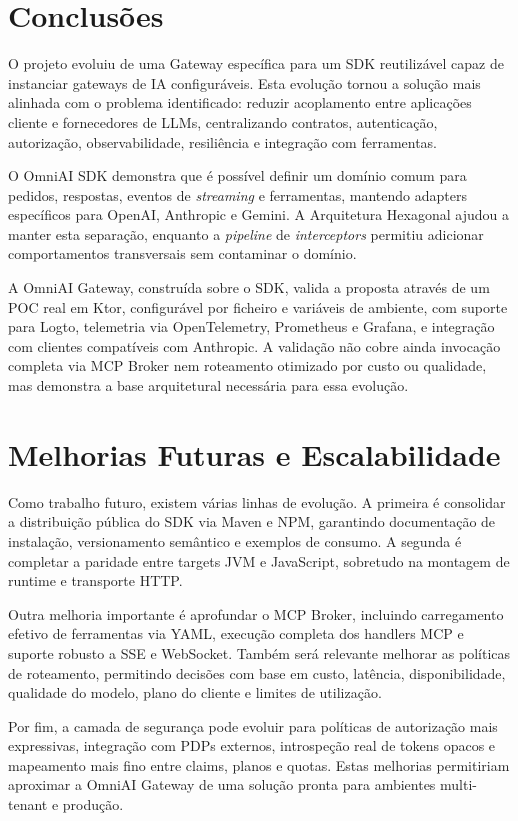 \documentclass[11pt,a4paper]{report}
\begin{document}
    \section{Conclusões}
    O projeto evoluiu de uma Gateway específica para um SDK reutilizável capaz de instanciar gateways de IA configuráveis. Esta evolução tornou a solução mais alinhada com o problema identificado: reduzir acoplamento entre aplicações cliente e fornecedores de LLMs, centralizando contratos, autenticação, autorização, observabilidade, resiliência e integração com ferramentas.

    O OmniAI SDK demonstra que é possível definir um domínio comum para pedidos, respostas, eventos de \textit{streaming} e ferramentas, mantendo adapters específicos para OpenAI, Anthropic e Gemini. A Arquitetura Hexagonal ajudou a manter esta separação, enquanto a \textit{pipeline} de \textit{interceptors} permitiu adicionar comportamentos transversais sem contaminar o domínio.

    A OmniAI Gateway, construída sobre o SDK, valida a proposta através de um POC real em Ktor, configurável por ficheiro e variáveis de ambiente, com suporte para Logto, telemetria via OpenTelemetry, Prometheus e Grafana, e integração com clientes compatíveis com Anthropic. A validação não cobre ainda invocação completa via MCP Broker nem roteamento otimizado por custo ou qualidade, mas demonstra a base arquitetural necessária para essa evolução.

    \section{Melhorias Futuras e Escalabilidade}
    Como trabalho futuro, existem várias linhas de evolução. A primeira é consolidar a distribuição pública do SDK via Maven e NPM, garantindo documentação de instalação, versionamento semântico e exemplos de consumo. A segunda é completar a paridade entre targets JVM e JavaScript, sobretudo na montagem de runtime e transporte HTTP.

    Outra melhoria importante é aprofundar o MCP Broker, incluindo carregamento efetivo de ferramentas via YAML, execução completa dos handlers MCP e suporte robusto a SSE e WebSocket. Também será relevante melhorar as políticas de roteamento, permitindo decisões com base em custo, latência, disponibilidade, qualidade do modelo, plano do cliente e limites de utilização.

    Por fim, a camada de segurança pode evoluir para políticas de autorização mais expressivas, integração com PDPs externos, introspeção real de tokens opacos e mapeamento mais fino entre claims, planos e quotas. Estas melhorias permitiriam aproximar a OmniAI Gateway de uma solução pronta para ambientes multi-tenant e produção.
\end{document}
